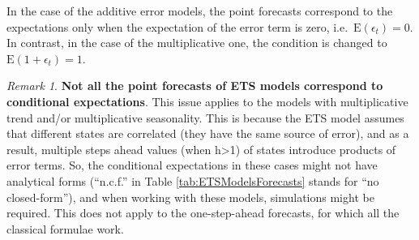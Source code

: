 \documentclass[
]{book}
\theoremstyle{definition}
\theoremstyle{definition}
\theoremstyle{definition}
\theoremstyle{definition}
\theoremstyle{remark}
\newtheorem*{remark}{Remark}
\begin{document}
In the case of the additive error models, the point forecasts correspond to the expectations only when the expectation of the error term is zero, i.e.~\(\text{E}(\epsilon_t)=0\). In contrast, in the case of the multiplicative one, the condition is changed to \(\text{E}(1+\epsilon_t)=1\).

\begin{remark}
\textbf{Not all the point forecasts of ETS models correspond to conditional expectations}. This issue applies to the models with multiplicative trend and/or multiplicative seasonality. This is because the ETS model assumes that different states are correlated (they have the same source of error), and as a result, multiple steps ahead values (when h\textgreater1) of states introduce products of error terms. So, the conditional expectations in these cases might not have analytical forms (``n.c.f.'' in Table \ref{tab:ETSModelsForecasts} stands for ``no closed-form''), and when working with these models, simulations might be required. This does not apply to the one-step-ahead forecasts, for which all the classical formulae work.
\end{remark}
\end{document}
